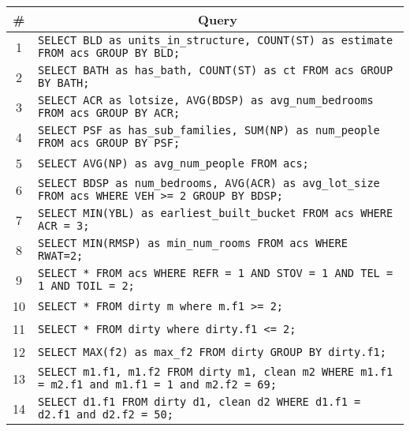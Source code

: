 \begin{tabular}{cl}
\toprule
\# & \multicolumn{1}{c}{Query} \\
\midrule
1 & \verb|SELECT BLD as units_in_structure, COUNT(ST) as estimate FROM acs GROUP BY BLD;| {queryno} \label{q1} \\
2 & \verb|SELECT BATH as has_bath, COUNT(ST) as ct FROM acs GROUP BY BATH;| {queryno} \label{q2} \\
3 & \verb|SELECT ACR as lotsize, AVG(BDSP) as avg_num_bedrooms FROM acs GROUP BY ACR;| {queryno} \label{q3} \\
4 & \verb|SELECT PSF as has_sub_families, SUM(NP) as num_people FROM acs GROUP BY PSF;| {queryno} \label{q4} \\
5 & \verb|SELECT AVG(NP) as avg_num_people FROM acs;| {queryno} \label{q5} \\
6 & \verb|SELECT BDSP as num_bedrooms, AVG(ACR) as avg_lot_size FROM acs WHERE VEH >= 2 GROUP BY BDSP;| {queryno} \label{q6} \\
7 & \verb|SELECT MIN(YBL) as earliest_built_bucket FROM acs WHERE ACR = 3;| {queryno} \label{q7} \\
8 & \verb|SELECT MIN(RMSP) as min_num_rooms FROM acs WHERE RWAT=2;| {queryno} \label{q8} \\
9 & \verb|SELECT * FROM acs WHERE REFR = 1 AND STOV = 1 AND TEL = 1 AND TOIL = 2;| {queryno} \label{q9} \\
10 & \verb|SELECT * FROM dirty m where m.f1 >= 2;| {queryno} \label{q10} \\
11 & \verb|SELECT * FROM dirty where dirty.f1 <= 2;| {queryno} \label{q11} \\
12 & \verb|SELECT MAX(f2) as max_f2 FROM dirty GROUP BY dirty.f1;| {queryno} \label{q12} \\
13 & \verb|SELECT m1.f1, m1.f2 FROM dirty m1, clean m2 WHERE m1.f1 = m2.f1 and m1.f1 = 1 and m2.f2 = 69;| {queryno} \label{q13} \\
14 & \verb|SELECT d1.f1 FROM dirty d1, clean d2 WHERE d1.f1 = d2.f1 and d2.f2 = 50;| {queryno} \label{q14} \\
\bottomrule
\end{tabular}

